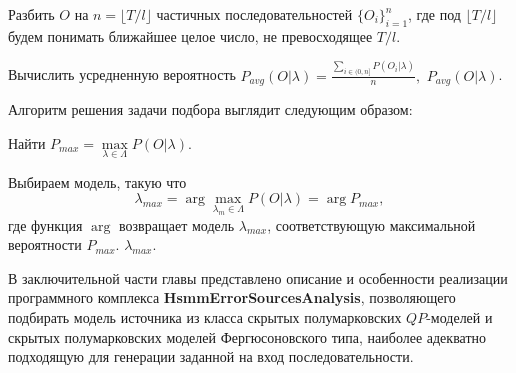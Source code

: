 \documentclass[twoside,12pt]{article}
\begin{document}
\begin{algorithm}[h]
\SetAlgoLined
\caption{${\mathrm{EvaluationProblemSolverExtended}}$}

Разбить $O$ на $n=\lfloor T/l \rfloor$ частичных последовательностей $\{O_i\}_{i=1}^n$, где под $\lfloor T/l \rfloor$ будем понимать ближайшее целое число, не превосходящее $T/l$.

\For{всех i из (0, n]}{вычислить вероятность $P(O_i|\lambda)=\widetilde{P}[O_i|\lambda]$ в соответствии с алгоритмом InverseProblemSolver}

Вычислить усредненную вероятность $P_{avg}(O|\lambda)=\frac{\sum\limits_{i\in (0,n]}P(O_i|\lambda)}{n},$
\KwRet $P_{avg}(O|\lambda)$.

\end{algorithm}

Алгоритм решения задачи подбора выглядит следующим образом:

\begin{algorithm}[h]
\SetAlgoLined
\caption{${\mathrm{InverseProblemSolver}}$}


Найти $P_{max}=\max\limits_{\lambda\in \Lambda}{P(O | \lambda)}.$

Выбираем модель, такую что
 $$\lambda_{max}=\arg\max\limits_{\lambda_m\in \Lambda} P(O | \lambda) = \arg P_{max},$$
где функция $\arg$ возвращает модель $\lambda_{max}$, соответствующую максимальной вероятности $P_{max}$.
\KwRet $\lambda_{max}$.

\end{algorithm}

В заключительной части главы представлено описание и особенности реализации программного комплекса \textbf{HsmmErrorSourcesAnalysis}, позволяющего подбирать модель источника из класса скрытых полумарковских $QP$-моделей и скрытых полумарковских моделей Фергюсоновского типа, наиболее адекватно подходящую для генерации заданной на вход последовательности.
\end{document}
